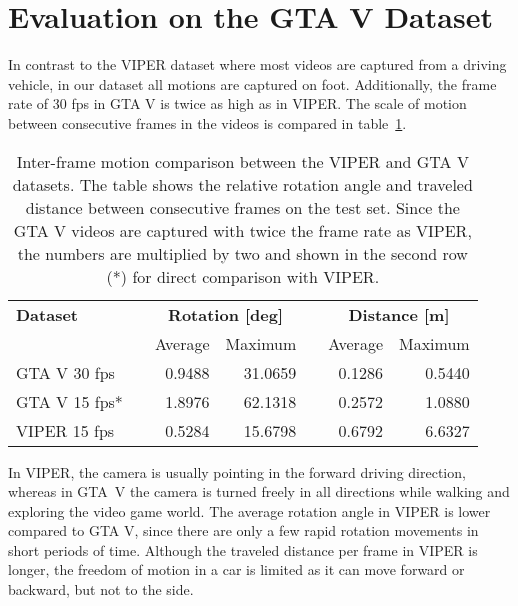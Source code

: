 	\section{Evaluation on the GTA V Dataset}
		In contrast to the VIPER dataset where most videos are captured from a driving vehicle, in our dataset all motions are captured on foot.
		Additionally, the frame rate of 30 fps in GTA V is twice as high as in VIPER.
		The scale of motion between consecutive frames in the videos is compared in table~\ref{tbl:viper-gta-comparison-inter-frame-motion}.
		\begin{table}[tb]
			\small
			\begin{center}
				\begin{tabular}{lcrrcrr}
					\toprule
					\textbf{Dataset} 		& 	& \multicolumn{2}{c}{\textbf{Rotation [deg]}} 		& & \multicolumn{2}{c}{\textbf{Distance [m]}} 		\\
									& 	& Average 		& Maximum			&	& Average 		& Maximum					\\
					\midrule
					GTA V 30 fps 	& 	&  0.9488	& 31.0659 		&	& 0.1286 	& 0.5440 				\\
					GTA V 15 fps*	& 	&  1.8976	& 62.1318		& 	& 0.2572	& 1.0880				\\
					VIPER 15 fps	&   & 0.5284	& 15.6798 		& 	& 0.6792	& 6.6327				\\
					\bottomrule
				\end{tabular}
			\end{center}
			\caption[Inter-frame motion comparison between the VIPER and GTA V datasets]
					{Inter-frame motion comparison between the VIPER and GTA V datasets.
					 The table shows the relative rotation angle and traveled distance between consecutive frames on the test set.
					 Since the GTA V videos are captured with twice the frame rate as VIPER, the numbers are multiplied by two and shown in the second row (*) for direct comparison with VIPER. 
					 \label{tbl:viper-gta-comparison-inter-frame-motion}}
			
		\end{table}
		In VIPER, the camera is usually pointing in the forward driving direction, whereas in \mbox{GTA V} the camera is turned freely in all directions while walking and exploring the video game world.
		The average rotation angle in VIPER is lower compared to GTA V, since there are only a few rapid rotation movements in short periods of time.
		Although the traveled distance per frame in VIPER is longer, the freedom of motion in a car is limited as it can move forward or backward, but not to the side.
		
